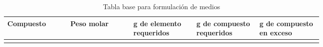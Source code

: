 \begin{table}[H]

\centering
\caption{Tabla base para formulación de medios}
\label{tab:tabla_base_para_formulación_medios}

\begin{threeparttable}
{\small{}

\begin{tabular}{M{0.15\linewidth}M{0.15\linewidth}M{0.15\linewidth}M{0.15\linewidth}M{0.15\linewidth}}\hline

    \textbf{Compuesto} & \textbf{Peso molar} & \textbf{g de elemento requeridos} & \textbf{g de compuesto requeridos} & \textbf{g de compuesto en exceso} \\ \hline
    
     &  &  &  & \\
    
    \hline
\end{tabular}}

\begin{tablenotes}\tiny %
    \item[] 
\end{tablenotes}

\end{threeparttable}
\end{table}